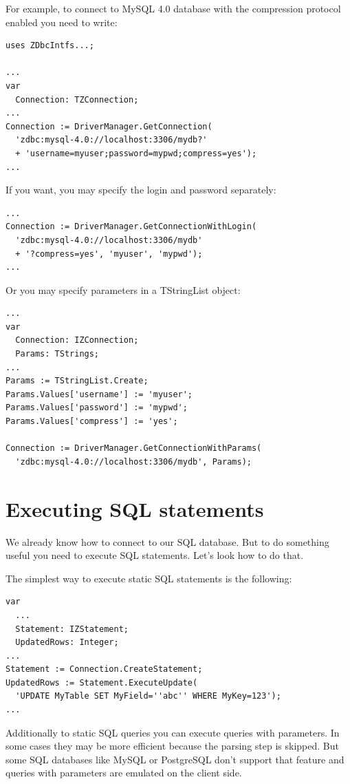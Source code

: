 \documentclass[a4paper,12pt,oneside]{book}
\begin{document}
For example, to connect to MySQL 4.0 database with the compression protocol enabled you need to write:
\begin{verbatim}
uses ZDbcIntfs...;

...
var
  Connection: TZConnection;
...
Connection := DriverManager.GetConnection(
  'zdbc:mysql-4.0://localhost:3306/mydb?'
  + 'username=myuser;password=mypwd;compress=yes');
...
\end{verbatim}

If you want, you may specify the login and password separately: 

\begin{verbatim}
...
Connection := DriverManager.GetConnectionWithLogin(
  'zdbc:mysql-4.0://localhost:3306/mydb'
  + '?compress=yes', 'myuser', 'mypwd');
...
\end{verbatim}

Or you may specify parameters in a TStringList object:

\begin{verbatim}
...
var
  Connection: IZConnection;
  Params: TStrings;
...
Params := TStringList.Create;
Params.Values['username'] := 'myuser';
Params.Values['password'] := 'mypwd';
Params.Values['compress'] := 'yes';

Connection := DriverManager.GetConnectionWithParams(
  'zdbc:mysql-4.0://localhost:3306/mydb', Params);
\end{verbatim}

\section{Executing SQL statements}
We already know how to connect to our SQL database. But to do something useful you need to execute SQL statements. Let's look how to do that.

The simplest way to execute static SQL statements is the following:
\begin{verbatim}
var
  ...
  Statement: IZStatement;
  UpdatedRows: Integer;
...
Statement := Connection.CreateStatement;
UpdatedRows := Statement.ExecuteUpdate(
  'UPDATE MyTable SET MyField=''abc'' WHERE MyKey=123');
...
\end{verbatim}

Additionally to static SQL queries you can execute queries with parameters.
In some cases they may be more efficient because the parsing step is skipped.
But some SQL databases like MySQL or PostgreSQL don't support that feature and queries with parameters are emulated on the client side. 
\end{document}
